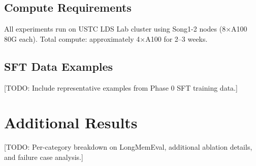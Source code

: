 \documentclass{article}
\begin{document}
\subsection{Compute Requirements}

All experiments run on USTC LDS Lab cluster using Song1-2 nodes (8$\times$A100 80G each). Total compute: approximately 4$\times$A100 for 2--3 weeks.

\subsection{SFT Data Examples}

[TODO: Include representative examples from Phase 0 SFT training data.]

\section{Additional Results}
\label{app:results}

[TODO: Per-category breakdown on LongMemEval, additional ablation details, and failure case analysis.]
\end{document}

